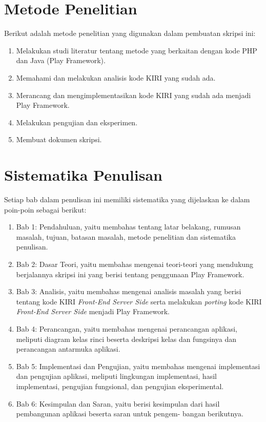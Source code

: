 \section{Metode Penelitian}
\label{sec:metodePenelitian}
Berikut adalah metode penelitian yang digunakan dalam pembuatan skripsi ini:
	\begin{enumerate}
		\item Melakukan studi literatur tentang metode yang berkaitan dengan kode PHP dan Java (Play Framework).
		\item Memahami dan melakukan analisis kode KIRI yang sudah ada.
		\item Merancang dan mengimplementasikan kode KIRI yang sudah ada menjadi Play Framework.
		\item Melakukan pengujian dan eksperimen.
		\item Membuat dokumen skripsi.
	\end{enumerate}
	
\section{Sistematika Penulisan}
\label{sec:sistematikaPenulisan}
Setiap bab dalam penulisan ini memiliki sistematika yang dijelaskan ke dalam poin-poin sebagai berikut:
	\begin{enumerate}
		\item Bab 1: Pendahuluan, yaitu membahas tentang latar belakang, rumusan masalah, tujuan, batasan masalah, metode penelitian dan sistematika penulisan.
		\item Bab 2: Dasar Teori, yaitu membahas mengenai teori-teori yang mendukung berjalannya skripsi ini yang berisi tentang penggunaan Play Framework.
		\item Bab 3: Analisis, yaitu membahas mengenai analisis masalah yang berisi tentang kode KIRI \textit{Front-End Server Side} serta melakukan \textit{porting} kode KIRI \textit{Front-End Server Side} menjadi Play Framework.
	\item Bab 4: Perancangan, yaitu membahas mengenai perancangan aplikasi, meliputi diagram kelas rinci beserta deskripsi kelas dan fungsinya dan perancangan antarmuka aplikasi.
	\item Bab 5: Implementasi dan Pengujian, yaitu membahas mengenai implementasi dan pengujian aplikasi, meliputi lingkungan implementasi, hasil implementasi, pengujian fungsional, dan pengujian eksperimental.
	\item Bab 6: Kesimpulan dan Saran, yaitu berisi kesimpulan dari hasil pembangunan aplikasi beserta saran untuk pengem- bangan berikutnya.
	\end{enumerate}
		
